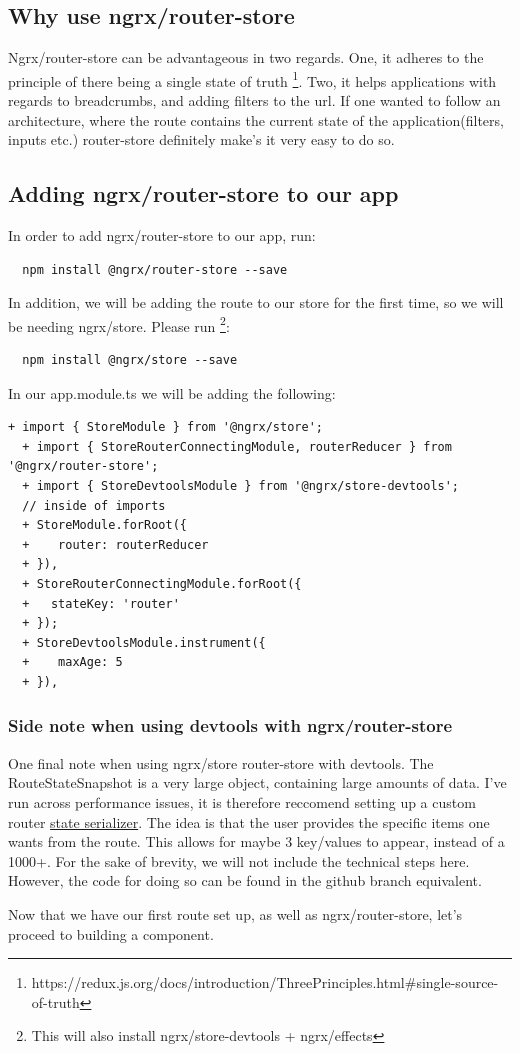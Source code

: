 \subsection{ Why use ngrx/router-store }

Ngrx/router-store can be advantageous in two regards. One, it adheres to the
principle of there being a single state of truth \footnote{https://redux.js.org/docs/introduction/ThreePrinciples.html\#single-source-of-truth}.
Two, it helps applications with regards to breadcrumbs, and adding filters to the
url. If one wanted to follow an architecture, where the route contains the current
state of the application(filters, inputs etc.) router-store definitely make's it
very easy to do so.

\subsection{ Adding ngrx/router-store to our app }

In order to add ngrx/router-store to our app, run:
\begin{verbatim}
  npm install @ngrx/router-store --save
\end{verbatim}

In addition, we will be adding the route to our store for the first time, so we
will be needing ngrx/store. Please run \footnote{This will also install ngrx/store-devtools + ngrx/effects}:
\begin{verbatim}
  npm install @ngrx/store --save
\end{verbatim}

In our app.module.ts we will be adding the following:
\begin{lstlisting}[caption=My Javascript Example]
  + import { StoreModule } from '@ngrx/store';
  + import { StoreRouterConnectingModule, routerReducer } from '@ngrx/router-store';
  + import { StoreDevtoolsModule } from '@ngrx/store-devtools';
  // inside of imports
  + StoreModule.forRoot({
  +    router: routerReducer
  + }),
  + StoreRouterConnectingModule.forRoot({
  +   stateKey: 'router'
  + });
  + StoreDevtoolsModule.instrument({
  +    maxAge: 5
  + }),
\end{lstlisting}

\subsubsection{ Side note when using devtools with ngrx/router-store }

One final note when using ngrx/store router-store with devtools. The
RouteStateSnapshot is a very large object, containing large amounts of data. I've
run across performance issues, it is therefore reccomend setting up a
custom router \href{https://github.com/ngrx/platform/blob/master/docs/router-store/api.md\#custom-router-state-serializer}{state serializer}.
The idea is that the user provides the specific items one wants from the route.
This allows for maybe 3 key/values to appear, instead of a 1000+. For the sake of
brevity, we will not include the technical steps here. However, the code for doing
so can be found in the github branch equivalent.

Now that we have our first route set up, as well as ngrx/router-store, let's proceed
to building a component.
